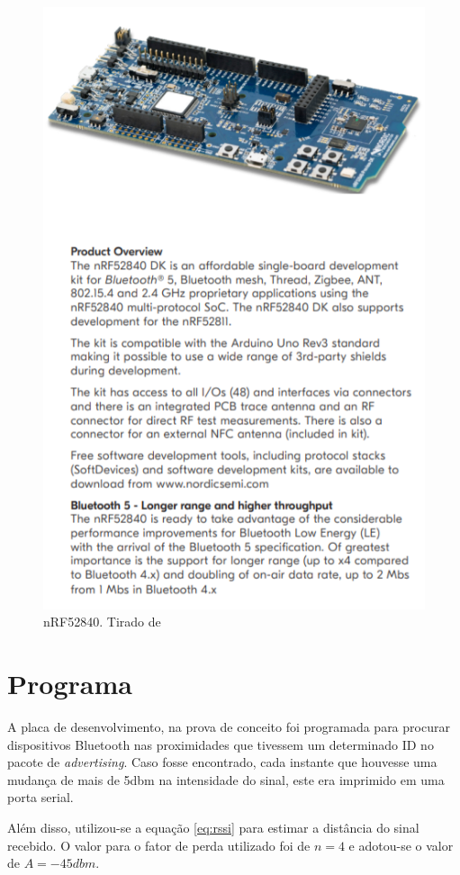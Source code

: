 \begin{figure}[H]
	\centering 
	\includegraphics[scale = 1]{images/nRF52840_dk.png}
	\caption{nRF52840. Tirado de \cite{nRF52840_site}}
	\label{fig:nRF52840_dk}
\end{figure}


\section{Programa}
A placa de desenvolvimento, na prova de conceito foi programada para procurar dispositivos Bluetooth nas proximidades que tivessem um determinado ID no pacote de \textit{advertising}. Caso fosse encontrado, cada instante que houvesse uma mudança de mais de 5dbm na intensidade do sinal, este era imprimido em uma porta serial.

Além disso, utilizou-se a equação \ref{eq:rssi} para estimar a distância do sinal recebido. O valor para o fator de perda utilizado foi de \(n = 4\) e adotou-se o valor de \(A = -45dbm\).

